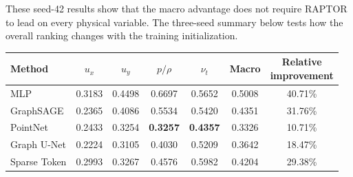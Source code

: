 \documentclass[a4paper,fleqn]{cas-sc}
\begin{document}
These seed-42 results show that the macro advantage does not require RAPTOR
to lead on every physical variable. The three-seed summary below tests how
the overall ranking changes with the training initialization.

\begin{center}
    \begin{minipage}{1.00\linewidth}
        \centering
    \label{tab:aoa_results}
    
    \renewcommand{\arraystretch}{1.12}
    \setlength{\tabcolsep}{4.5pt}
    \small
    
    \begin{tabular}{@{}lccccc@{\hspace{8pt}}c@{}}
        \toprule
        Method
        & \(u_x\)
        & \(u_y\)
        & \(p/\rho\)
        & \(\nu_t\)
        & Macro
        & \shortstack{Relative\\improvement} \\
        \midrule
        
        
        MLP
        & 0.3183
        & 0.4498
        & 0.6697
        & 0.5652
        & 0.5008
        & 40.71\% \\
        
        GraphSAGE
        & 0.2365
        & 0.4086
        & 0.5534
        & 0.5420
        & 0.4351
        & 31.76\% \\
        
        PointNet
        & 0.2433
        & 0.3254
        & \textbf{0.3257}
        & \textbf{0.4357}
        & 0.3326
        & 10.71\% \\
        
        Graph U-Net
        & 0.2224
        & 0.3105
        & 0.4030
        & 0.5209
        & 0.3642
        & 18.47\% \\
        
        \midrule
        
        Sparse Token 
        & 0.2993
        & 0.3267
        & 0.4576
        & 0.5982
        & 0.4204
        & 29.38\% \\
        

\end{tabular}
\end{minipage}
\end{center}
\end{document}
